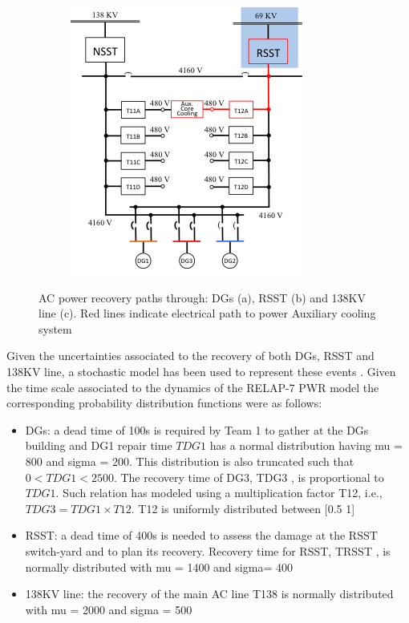 \begin{figure}
\begin{subfigure}[b]{0.3\textwidth}
                \includegraphics[width=\textwidth]{figures/ACpowerRecPathRSST.png}
                \caption{}
                \label{fig:ACpowerRSST}
        \end{subfigure}
        \caption{AC power recovery paths through: DGs (a), RSST (b) and 138KV line (c). Red lines indicate electrical path to power Auxiliary cooling system}\label{fig:ACPowerRecovery}
\end{figure}

Given the uncertainties associated to the recovery of both DGs, RSST and 138KV line, a stochastic model has been used to represent these events . Given the time scale associated to the dynamics of the RELAP-7 PWR model the corresponding probability distribution functions were as follows:
\begin{itemize}
\item DGs: a dead time of 100s is required by Team 1 to gather at the DGs building and DG1 repair time $TDG1$ has a normal distribution having mu = 800 and sigma = 200. This distribution is also truncated such that $0 < TDG1 < 2500$. The recovery time of DG3, TDG3 , is proportional to $TDG1$. Such relation has modeled using a multiplication factor T12, i.e., $TDG3 = TDG1\times T12$. T12 is uniformly distributed between [0.5 1]
\item RSST: a dead time of 400s is needed to assess the damage at the RSST switch-yard and to plan its recovery. Recovery time for RSST, TRSST , is normally distributed with mu = 1400 and sigma= 400
\item 138KV line: the recovery of the main AC line T138 is normally distributed with mu = 2000 and sigma = 500
\end{itemize}

